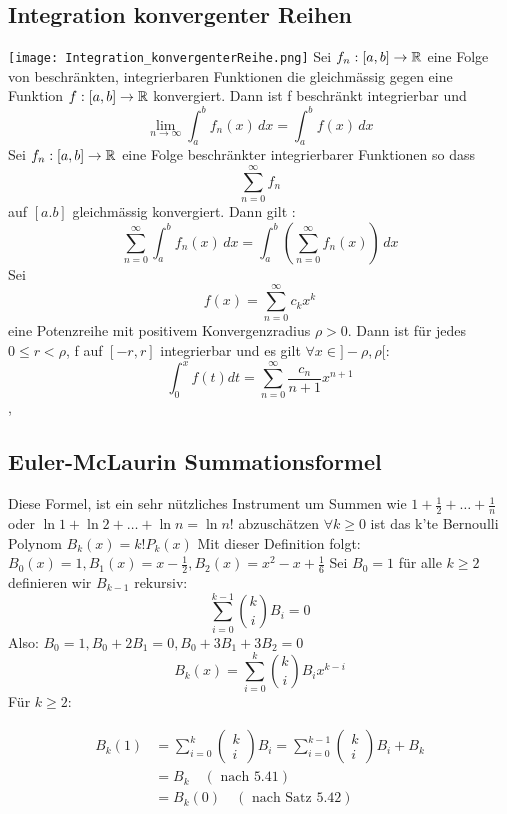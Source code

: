 \subsection{Integration konvergenter Reihen}
\texttt{[image: Integration\_konvergenterReihe.png]} \newline
\Satz[5.34] Sei \(f_n : [a,b] \rightarrow \mathbb{R} \) eine Folge von beschränkten, integrierbaren Funktionen die gleichmässig gegen eine Funktion \(f:[a,b] \rightarrow \mathbb{R} \) konvergiert. Dann ist f beschränkt integrierbar und
\[ \lim\limits_{n \rightarrow \infty} \int_{a}^{b} f_n(x) \,dx = \int_{a}^{b} f(x) \,dx \]
\Korollar[5.35] Sei \(f_n : [a,b] \rightarrow \mathbb{R}\) eine Folge beschränkter integrierbarer Funktionen so dass
\[ \sum_{n=0}^\infty f_n\]
auf \([a.b]\) gleichmässig konvergiert. Dann gilt :
\[ \sum_{n=0}^\infty \int_{a}^{b} f_n(x) \,dx = \int_{a}^{b} \left( \sum_{n=0}^{\infty} f_n(x) \right) \,dx \]
\Korollar[5.36] Sei
\[ f(x) = \sum_{n=0}^{\infty} c_kx^k\]
eine Potenzreihe mit positivem Konvergenzradius \( \rho > 0\). Dann ist für jedes \( 0 \leq r < \rho\), f auf \([-r,r]\) integrierbar und es gilt \( \forall x \in ] -\rho, \rho[:\)
\[ \int_{0}^{x} f(t) dt = \sum_{n=0}^{\infty} \frac{c_n}{n+1} x^{n+1}\]
\sep
\subsection{Euler-McLaurin Summationsformel}
Diese Formel, ist ein sehr nützliches Instrument um Summen wie  \( 1 + \frac{1}{2} + \dots + \frac{1}{n}\)
oder \( \ln 1 + \ln 2 + \dots + \ln n = \ln n!\) abzuschätzen \newline
\Def[5.40] \( \forall k \geq 0 \) ist das k'te Bernoulli Polynom \(B_k(x) = k!P_k(x)\) Mit dieser Definition folgt: \(B_0(x) = 1, B_1(x) = x - \frac{1}{2}, B_2(x) = x^2 - x + \frac{1}{6}\)
\Def[5.41] Sei \(B_0 = 1\) für alle \( k \geq 2 \) definieren wir \(B_{k-1}\) rekursiv:
\[ \sum_{i=0}^{k-1} \binom{k}{i} B_i = 0\]
Also: \( B_0 = 1, B_0 + 2B_1 = 0, B_0 + 3B_1 + 3B_2 =0 \)
\Satz[5.42] \[ B_k(x) = \sum_{i=0}^{k} \binom{k}{i} B_ix^{k-i}\]
 Für \( k \geq 2\):

\begin{equation}
\begin{aligned}
B_{k}(1) &=\sum_{i=0}^{k}\left(\begin{array}{c}
k \\
i
\end{array}\right) B_{i}=\sum_{i=0}^{k-1}\left(\begin{array}{l}
k \\
i
\end{array}\right) B_{i}+B_{k} \\
&=B_{k} \quad(\text { nach } 5.41) \\
&=B_{k}(0) \quad(\text { nach Satz } 5.42)
\end{aligned}
\end{equation}

